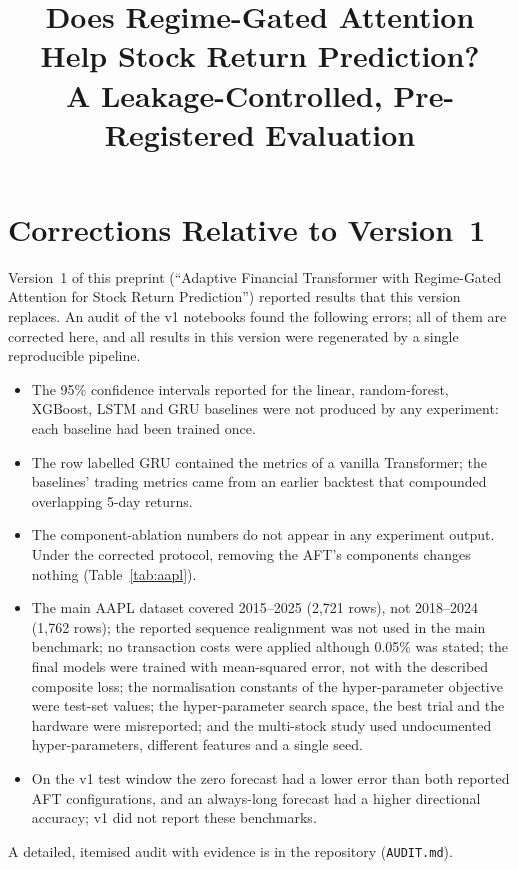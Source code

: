 \documentclass[conference]{IEEEtran}
\begin{document}
\title{Does Regime-Gated Attention Help Stock Return Prediction?\\A Leakage-Controlled, Pre-Registered Evaluation}
\author{
}
\maketitle



\appendices
\section{Corrections Relative to Version~1}
\label{app:v1}
Version~1 of this preprint (``Adaptive Financial Transformer with Regime-Gated Attention for Stock Return Prediction'') reported results that this version replaces. An audit of the v1 notebooks found the following errors; all of them are corrected here, and all results in this version were regenerated by a single reproducible pipeline.
\begin{itemize}
\item The 95\% confidence intervals reported for the linear, random-forest, XGBoost, LSTM and GRU baselines were not produced by any experiment: each baseline had been trained once.
\item The row labelled GRU contained the metrics of a vanilla Transformer; the baselines' trading metrics came from an earlier backtest that compounded overlapping 5-day returns.
\item The component-ablation numbers do not appear in any experiment output. Under the corrected protocol, removing the AFT's components changes nothing (Table~\ref{tab:aapl}).
\item The main AAPL dataset covered 2015--2025 (2{,}721 rows), not 2018--2024 (1{,}762 rows); the reported sequence realignment was not used in the main benchmark; no transaction costs were applied although 0.05\% was stated; the final models were trained with mean-squared error, not with the described composite loss; the normalisation constants of the hyper-parameter objective were test-set values; the hyper-parameter search space, the best trial and the hardware were misreported; and the multi-stock study used undocumented hyper-parameters, different features and a single seed.
\item On the v1 test window the zero forecast had a lower error than both reported AFT configurations, and an always-long forecast had a higher directional accuracy; v1 did not report these benchmarks.
\end{itemize}
A detailed, itemised audit with evidence is in the repository (\texttt{AUDIT.md}).
\end{document}
